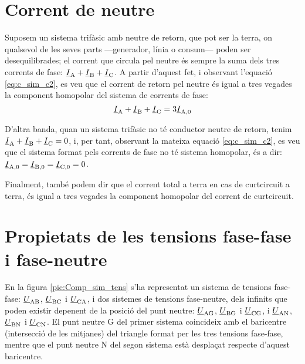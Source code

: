\section{Corrent de neutre}\label{sec:corrent-neutre}

Suposem un sistema trifàsic amb neutre de retorn, que pot ser la
terra, on qualsevol de les seves parts ---generador, línia o consum---
poden ser desequilibrades; el corrent que circula pel neutre és
sempre la suma dels tres corrents de fase: $\underline{I}_\mathrm{A}+
\underline{I}_\mathrm{B}+\underline{I}_\mathrm{C}$. A partir d'aquest fet, i
observant l'equació \eqref{eq:c_sim_c2}, es veu que el corrent de
retorn pel neutre és igual a tres vegades la component homopolar
del sistema de corrents de fase:
\begin{equation}
    \underline{I}_\mathrm{A}+\underline{I}_\mathrm{B}+\underline{I}_\mathrm{C} =3 \underline{I}_\mathrm{A,0}
\end{equation}

D'altra banda, quan un sistema trifàsic no té conductor neutre de retorn, tenim
$\underline{I}_\mathrm{A}+ \underline{I}_\mathrm{B}+\underline{I}_\mathrm{C}=0$, i, per tant,
observant la mateixa equació \eqref{eq:c_sim_c2}, es veu que el
sistema format pels corrents de fase no té sistema homopolar, és a dir: $\underline{I}_\mathrm{A,0}=\underline{I}_\mathrm{B,0}=\underline{I}_\mathrm{C,0}=0$.

Finalment, també podem dir que el corrent total a terra en cas de
curtcircuit a terra, és igual a tres vegades la component homopolar del
corrent de curtcircuit.

\section{Propietats de les tensions fase-fase i fase-neutre}\label{sec:comp-sim-neutre}
 

En la figura \vref{pic:Comp_sim_tens} s'ha representat un sistema de
tensions fase-fase: $\underline{U}_\mathrm{AB}$,
$\underline{U}_\mathrm{BC}$ i $\underline{U}_\mathrm{CA}$, i dos
sistemes de tensions fase-neutre, dels infinits que poden existir
depenent de la posició del punt neutre: $\underline{U}_\mathrm{AG}$,
$\underline{U}_\mathrm{BG}$ i $\underline{U}_\mathrm{CG}$, i
$\underline{U}_\mathrm{AN}$, $\underline{U}_\mathrm{BN}$ i
$\underline{U}_\mathrm{CN}$. El punt neutre G del primer sistema
coincideix amb el baricentre (intersecció de les mitjanes) del
triangle  format per les tres tensions fase-fase, mentre que el
punt neutre N del segon sistema està desplaçat respecte
d'aquest baricentre.


